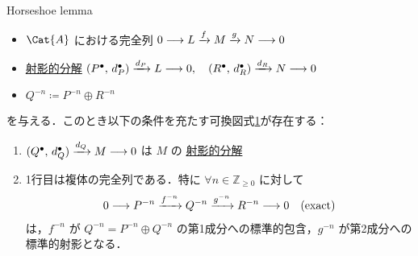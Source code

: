 \documentclass[algtopo_main]{subfiles}
\begin{document}
\begin{mylem}[label=lem:LDF-2]{Horseshoe lemma}
    \begin{itemize}
        \item $\Cat{A}$ における完全列 $0 \longrightarrow L \xrightarrow{f} M \xrightarrow{g} N \longrightarrow 0$
        \item \hyperref[def:projective-resolution]{射影的分解}
        $(P^\bullet,\, d^\bullet_P) \xrightarrow{d_P} L \longrightarrow 0,\quad (R^\bullet,\, d^\bullet_R) \xrightarrow{d_R} N \longrightarrow 0$
        \item $Q^{-n} \coloneqq P^{-n} \oplus R^{-n}$
    \end{itemize}
    を与える．このとき以下の条件を充たす可換図式\ref{cmtd:LDF-2}が存在する：
    \begin{enumerate}
        \item $(Q^\bullet,\, d_Q^\bullet) \xrightarrow{d_Q} M \longrightarrow 0$ は $M$ の \hyperref[def:projective-resolution]{射影的分解}
        \item 1行目は複体の完全列である．特に $\forall n \in \mathbb{Z}_{\ge 0}$ に対して
        \begin{align}
            0 \longrightarrow P^{-n} \xrightarrow{f^{-n}} Q^{-n} \xrightarrow{g^{-n}} R^{-n} \longrightarrow 0 \quad (\text{exact})
        \end{align}
        は，$f^{-n}$ が $Q^{-n} = P^{-n} \oplus Q^{-n}$ の第1成分への標準的包含，$g^{-n}$ が第2成分への標準的射影となる．
    \end{enumerate}
\end{mylem}

\begin{figure}[H]
    \centering
    \caption{}
    \label{cmtd:LDF-2}
\end{figure}%
\end{document}
